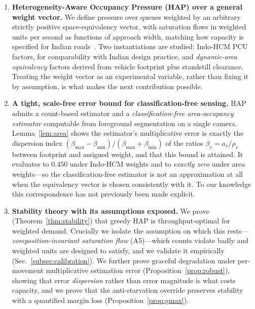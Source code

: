 \documentclass[journal]{IEEEtran}
\begin{document}
\begin{enumerate}
\item \textbf{Heterogeneity-Aware Occupancy Pressure (HAP) over a
      general weight vector.} We define pressure over queues weighted by
      an arbitrary strictly positive space-equivalency vector, with
      saturation flows in weighted units per second as functions of
      approach width, matching how capacity is specified for Indian
      roads~\cite{b_indohcm,b_radha}. Two instantiations are studied:
      Indo-HCM PCU factors, for comparability with Indian design
      practice, and \emph{dynamic-area equivalency} factors derived from
      vehicle footprint plus standstill clearance. Treating the weight
      vector as an experimental variable, rather than fixing it by
      assumption, is what makes the next contribution possible.
\item \textbf{A tight, scale-free error bound for classification-free
      sensing.} HAP admits a count-based estimator and a
      \emph{classification-free area-occupancy estimator} computable from
      foreground segmentation on a single camera. Lemma~\ref{lem:area}
      shows the estimator's multiplicative error is exactly the
      dispersion index $(\beta_{\max}-\beta_{\min})/
      (\beta_{\max}+\beta_{\min})$ of the ratios $\beta_v=a_v/\rho_v$
      between footprint and assigned weight, and that this bound is
      attained. It evaluates to $0.450$ under Indo-HCM weights and to
      \emph{exactly zero} under area weights---so the classification-free
      estimator is not an approximation at all when the equivalency
      vector is chosen consistently with it. To our knowledge this
      correspondence has not previously been made explicit.
\item \textbf{Stability theory with its assumptions exposed.} We prove
      (Theorem~\ref{thm:stability}) that greedy HAP is throughput-optimal
      for weighted demand. Crucially we isolate the assumption on which
      this rests---\emph{composition-invariant saturation flow}
      (A5)---which counts violate badly and weighted units are designed
      to satisfy, and we validate it empirically
      (Sec.~\ref{subsec:calibration}). We further prove graceful
      degradation under per-movement multiplicative estimation error
      (Proposition~\ref{prop:robust}), showing that error \emph{dispersion}
      rather than error magnitude is what costs capacity, and we prove
      that the anti-starvation override preserves stability with a
      quantified margin loss (Proposition~\ref{prop:gmax}).

\end{enumerate}
\end{document}
